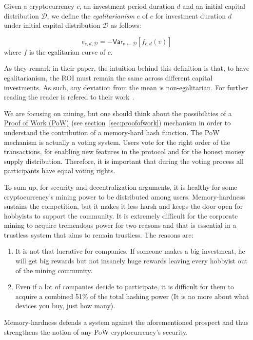 \begin{definition}[Egalitarianism]
  Given a cryptocurrency $c$, an investment period duration $d$ and an initial
  capital distribution $\mathcal{D}$, we define the \emph{egalitarianism} $e$ of $c$
  for investment duration $d$ under initial capital distribution $\mathcal{D}$
  as follows:

  \begin{equation} \nonumber
    e_{c,d,\mathcal{D}} = -\textsf{Var}_{v \gets \mathcal{D}}[f_{c,d}(v)]
  \end{equation}
  where $f$ is the egalitarian curve of $c$.
\end{definition}

As they remark in their paper, the intuition behind this definition is that, to have egalitarianism, the ROI must remain the same across different capital investments. As such, any deviation from the mean is non-egalitarian. For further reading the reader is refered to their work~\cite{egalitarianism}.
\pagebreak

We are focusing on mining, but one should think about the possibilities of a \hyperref[sec:proofofwork]{Proof of Work (PoW)} (see \hyperref[sec:proofofwork]{section}~\ref{sec:proofofwork}) mechanism in order to understand the contribution of a memory-hard hash function. The PoW mechanism is actually a voting system. Users vote for the right order of the transactions, for enabling new features in the protocol and for the honest money supply distribution. Therefore, it is important that during the voting process all participants have equal voting rights.

To sum up, for security and decentralization arguments, it is healthy for some cryptocurrency's mining power to be distributed among users. Memory-hardness sustains the competition, but it makes it less harsh and keeps the door open for hobbyists to support the community. It is extremely difficult for the corporate mining to acquire tremendous power for two reasons and that is essential in a trustless system that aims to remain trustless. The reasons are:
\begin{enumerate}[label=(\greek*)]
  \item It is not that lucrative for companies. If someone makes a big investment, he will get big rewards but not insanely huge rewards leaving every hobbyist out of the mining community.
  \item Even if a lot of companies decide to participate, it is difficult for them to acquire a combined 51\% of the total hashing power (It is no more about what devices you buy, just how many).
\end{enumerate}

Memory-hardness defends a system against the aforementioned prospect and thus strengthens the notion of any PoW cryptocurrency's security.
